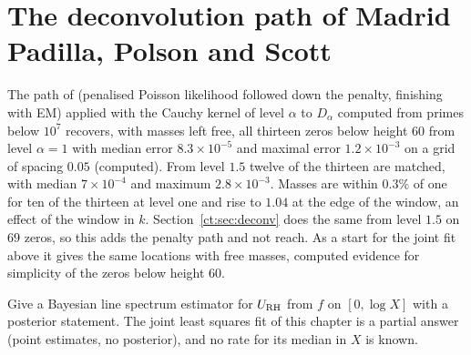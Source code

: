 \section{The deconvolution path of Madrid Padilla, Polson and Scott}

The path of \cite{PadillaPolsonScott18} (penalised Poisson likelihood followed down the penalty, finishing with EM) applied with the Cauchy kernel of level $\alpha$ to $D_\alpha$ computed from primes below $10^7$ recovers, with masses left free, all thirteen zeros below height $60$ from level $\alpha=1$ with median error $8.3\times10^{-5}$ and maximal error $1.2\times10^{-3}$ on a grid of spacing $0.05$ (computed). From level $1.5$ twelve of the thirteen are matched, with median $7\times10^{-4}$ and maximum $2.8\times10^{-3}$. Masses are within $0.3\%$ of one for ten of the thirteen at level one and rise to $1.04$ at the edge of the window, an effect of the window in $k$. Section~\ref{ct:sec:deconv} does the same from level $1.5$ on $69$ zeros, so this adds the penalty path and not reach. As a start for the joint fit above it gives the same locations with free masses, computed evidence for simplicity of the zeros below height $60$.

\begin{problem}
Give a Bayesian line spectrum estimator for $U_{\rm RH}$ from $f$ on $[0,\log X]$ with a posterior statement. The joint least squares fit of this chapter is a partial answer (point estimates, no posterior), and no rate for its median in $X$ is known.
\end{problem}
